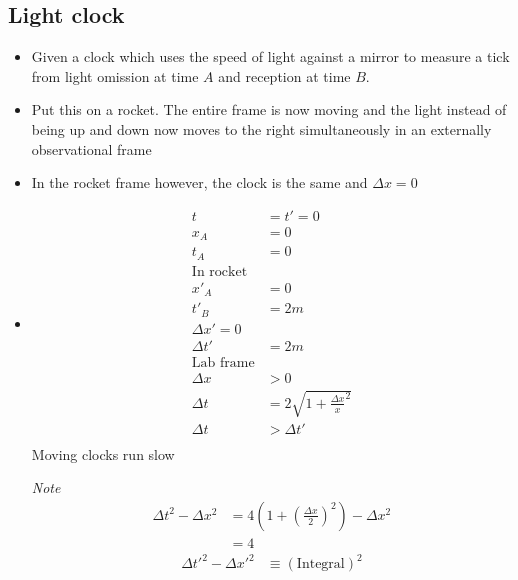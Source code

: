 \documentclass[12pt,letterpaper, twocolumn]{article}
\begin{document}
\subsection{Light clock}
\begin{itemize}
    \item Given a clock which uses the speed of light against a mirror to measure a tick from light omission at time $A$ and reception at time $B$. 
    \item Put this on a rocket. The entire frame is now moving and the light instead of being up and down now moves to the right simultaneously in an externally observational frame
    \item In the rocket frame however, the clock is the same and $\Delta x=0$
    \item \begin{align*}
        t&=t'=0\\
        x_A&=0\\
        t_A&=0\\
        \text{In rocket}\\
        x'_A&=0\\
        t'_B&=2m\\
        \Delta x'=0\\
        \Delta t'&=2m\\
        \text{Lab frame}\\
        \Delta x &> 0\\
        \Delta t &= 2\sqrt{1+\frac{\Delta x}{x}^2}\\
        \Delta t &> \Delta t'\\ 
    \end{align*}
    Moving clocks run slow

    \textit{Note} \begin{align*}
        \Delta t^2-\Delta x^2 &= 4(1+(\frac{\Delta x}{2})^2)-\Delta x^2\\
        &= 4
    \end{align*}
    \begin{align*}
        \Delta t'^2-\Delta x'^2&\equiv (\text{Integral})^2
    \end{align*}
\end{itemize}
\end{document}
